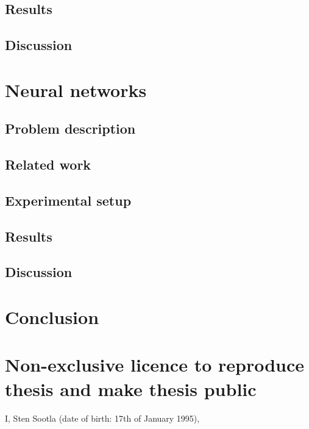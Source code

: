 \documentclass[12pt]{article}
\begin{document}
\subsection{Results}
\subsection{Discussion}

\newpage
\section{Neural networks}

\subsection{Problem description}
\subsection{Related work}
\subsection{Experimental setup}
\subsection{Results}
\subsection{Discussion}

\newpage
\section{Conclusion}





\newpage




\appendix
\pagebreak
\section*{\small Non-exclusive licence to reproduce thesis and make thesis public}


I, Sten Sootla (date of birth: 17th of January 1995),
\end{document}
